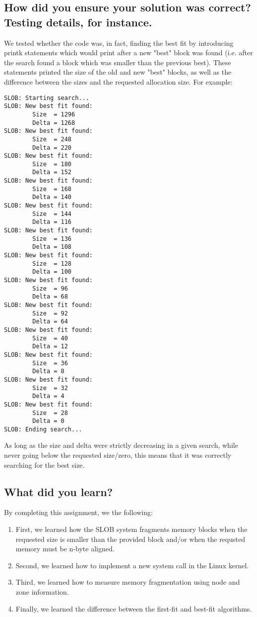 \documentclass[letterpaper,10pt,titlepage,draftclsnofoot,onecolumn]{article}
\begin{document}
\subsection{How did you ensure your solution was correct? Testing details, for instance.}

We tested whether the code was, in fact, finding the best fit by introducing printk statements which would print after a new "best" block was found (i.e. after the search found a block which was smaller than the previous best). These statements printed the size of the old and new "best" blocks, as well as the difference between the sizes and the requested allocation size. For example:

\begin{verbatim}
SLOB: Starting search...
SLOB: New best fit found:
        Size  = 1296
        Delta = 1268
SLOB: New best fit found:
        Size  = 248
        Delta = 220
SLOB: New best fit found:
        Size  = 180
        Delta = 152
SLOB: New best fit found:
        Size  = 168
        Delta = 140
SLOB: New best fit found:
        Size  = 144
        Delta = 116
SLOB: New best fit found:
        Size  = 136
        Delta = 108
SLOB: New best fit found:
        Size  = 128
        Delta = 100
SLOB: New best fit found:
        Size  = 96
        Delta = 68
SLOB: New best fit found:
        Size  = 92
        Delta = 64
SLOB: New best fit found:
        Size  = 40
        Delta = 12
SLOB: New best fit found:
        Size  = 36
        Delta = 8
SLOB: New best fit found:
        Size  = 32
        Delta = 4
SLOB: New best fit found:
        Size  = 28
        Delta = 0
SLOB: Ending search...
\end{verbatim}

As long as the size and delta were strictly decreasing in a given search, while never going below the requested size/zero, this means that it was correctly searching for the best size.

\subsection{What did you learn?}
By completing this assignment, we the following:
\begin{enumerate}
\item First, we learned how the SLOB system fragments memory blocks when the requested size is smaller than the provided block and/or when the requsted memory must be n-byte aligned.
\item Second, we learned how to implement a new system call in the Linux kernel.
\item Third, we learned how to measure memory fragmentation using node and zone information.
\item Finally, we learned the difference between the first-fit and best-fit algorithms.
\end{enumerate}
\end{document}
